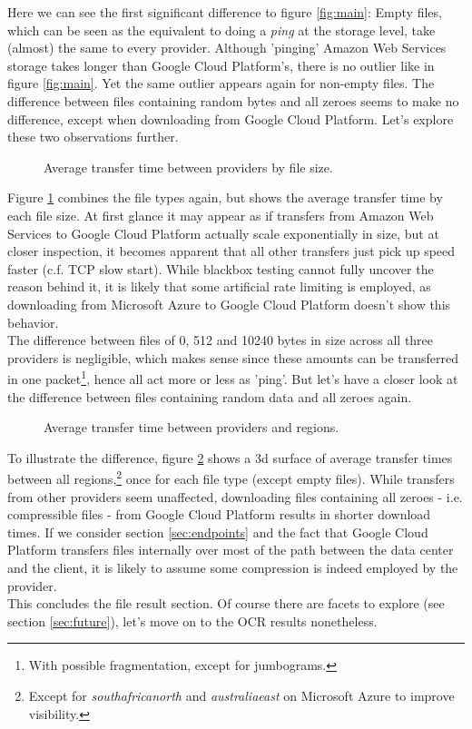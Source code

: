 \documentclass[a4paper,bibliography=totoc]{scrartcl}
\newcommand{\Azure}{Microsoft Azure\xspace}
\newcommand{\GCP}{Google Cloud Platform\xspace}
\newcommand{\AWS}{Amazon Web Services\xspace}
\begin{document}
Here we can see the first significant difference to figure \ref{fig:main}: Empty files, which can be seen as the equivalent to doing a \textit{ping} at the storage level, take (almost) the same to every provider. Although 'pinging' \AWS storage takes longer than \GCP's, there is no outlier like in figure \ref{fig:main}. Yet the same outlier appears again for non-empty files. The difference between files containing random bytes and all zeroes seems to make no difference, except when downloading from \GCP. Let's explore these two observations further.\\
\begin{figure}[!ht]
    \centering
    
    \caption{Average transfer time between providers by file size.}
    \label{fig:sized}
\end{figure}%
Figure \ref{fig:sized} combines the file types again, but shows the average transfer time by each file size. At first glance it may appear as if transfers from \AWS to \GCP actually scale exponentially in size, but at closer inspection, it becomes apparent that all other transfers just pick up speed faster (c.f. TCP slow start\cite{tcp_congestion}). While blackbox testing cannot fully uncover the reason behind it, it is likely that some artificial rate limiting is employed, as downloading from \Azure to \GCP doesn't show this behavior.\\
The difference between files of 0, 512 and 10240 bytes in size across all three providers is negligible, which makes sense since these amounts can be transferred in one packet\footnote{With possible fragmentation, except for jumbograms.\cite{jumbograms}}, hence all act more or less as 'ping'. But let's have a closer look at the difference between files containing random data and all zeroes again.\\
\begin{figure}[!ht]
    \centering
    \qquad
    \caption{Average transfer time between providers and regions.}
    \label{fig:area}
\end{figure}%
To illustrate the difference, figure \ref{fig:area} shows a 3d surface of average transfer times between all regions,\footnote{Except for \textit{southafricanorth} and \textit{australiaeast} on \Azure to improve visibility.} once for each file type (except empty files). While transfers from other providers seem unaffected, downloading files containing all zeroes - i.e. compressible files - from \GCP results in shorter download times. If we consider section \ref{sec:endpoints} and the fact that \GCP transfers files internally over most of the path between the data center and the client, it is likely to assume some compression is indeed employed by the provider.\\
This concludes the file result section. Of course there are facets to explore (see section \ref{sec:future}), let's move on to the OCR results nonetheless.
\end{document}
